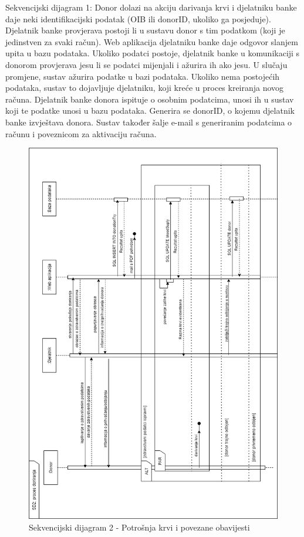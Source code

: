     	    	\par {
    	    	    Sekvencijski dijagram 1: Donor dolazi na akciju darivanja krvi i djelatniku banke daje neki 
identifikacijski podatak (OIB ili donorID, ukoliko ga posjeduje).
Djelatnik banke provjerava postoji li u sustavu donor s tim podatkom (koji je
jedinstven za svaki račun). Web aplikacija djelatniku banke daje odgovor slanjem
upita u bazu podataka. Ukoliko podatci postoje, djelatnik banke u komunikaciji s 
donorom provjerava jesu li se podatci mijenjali i ažurira ih ako jesu.
U slučaju promjene, sustav ažurira podatke u bazi podataka.
Ukoliko nema postojećih podataka, sustav to dojavljuje djelatniku, koji kreće
u proces kreiranja novog računa. Djelatnik banke donora ispituje o osobnim podatcima,
unosi ih u sustav koji te podatke unosi u bazu podataka. Generira se donorID,
o kojemu djelatnik banke izvještava donora. Sustav također šalje e-mail s generiranim
podatcima o računu i poveznicom za aktivaciju računa.
    	    	}
    	    	
				\begin{figure}[H]
    			\includegraphics[scale=0.7]{slike/SD2_rot.png} %
    			\centering
    			\caption{Sekvencijski dijagram 2 - Potrošnja krvi i povezane obavijesti}
    			\label{fig:promjene}
    	    	\end{figure}
				
